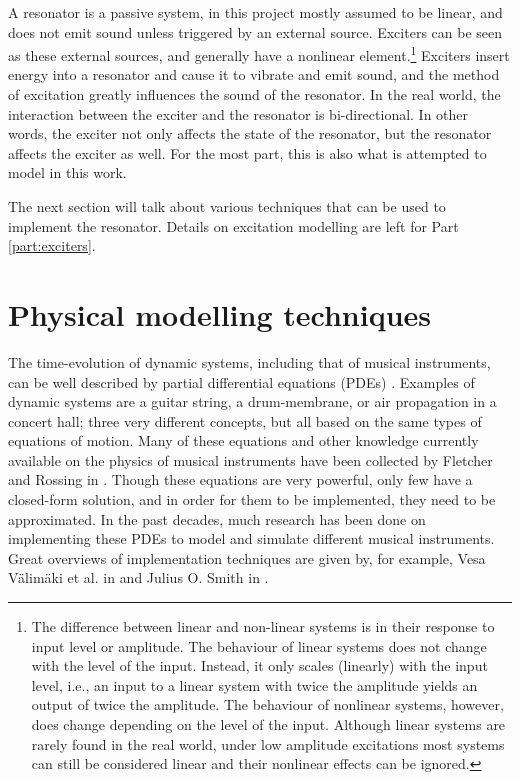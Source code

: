 A resonator is a passive system, in this project  mostly assumed to be linear, and does not emit sound unless triggered by an external source. Exciters can be seen as these external sources, and generally have a nonlinear element.\footnote{The difference between linear and non-linear systems is in their response to input level or amplitude. The behaviour of linear systems does not change with the level of the input. Instead, it only scales (linearly) with the input level, i.e., an input to a linear system with twice the amplitude yields an output of twice the amplitude. The behaviour of nonlinear systems, however, does change depending on the level of the input. Although linear systems are rarely found in the real world, under low amplitude excitations most systems can still be considered linear and their nonlinear effects can be ignored.} Exciters insert energy into a resonator and cause it to vibrate and emit sound, and the method of excitation greatly influences the sound of the resonator. In the real world, the interaction between the exciter and the resonator is bi-directional. In other words, the exciter not only affects the state of the resonator, but the resonator affects the exciter as well. For the most part, this is also what is attempted to model in this work.

The next section will talk about various techniques that can be used to implement the resonator. Details on  excitation modelling are left for Part \ref{part:exciters}.

\section{Physical modelling techniques}\label{sec:physModTech}
The time-evolution of dynamic systems, including that of musical instruments, can be well described by partial differential equations (PDEs) \cite{Fletcher1998, theBible}. Examples of dynamic systems are a guitar string, a drum-membrane, or air propagation in a concert hall; three very different concepts, but all based on the same types of equations of motion. Many of these equations and other knowledge currently available on the physics of musical instruments have been collected by Fletcher and Rossing in \cite{Fletcher1998}. Though these equations are very powerful, only few have a closed-form solution, and in order for them to be implemented, they need to be approximated. In the past decades, much research has been done on implementing these PDEs to model and simulate different musical instruments. Great overviews of implementation techniques are given by, for example, Vesa V{\"a}lim{\"a}ki et al. in \cite{Valimaki2006} and Julius O. Smith in \cite{Smith2010a, Smith2010b}. 
\\

